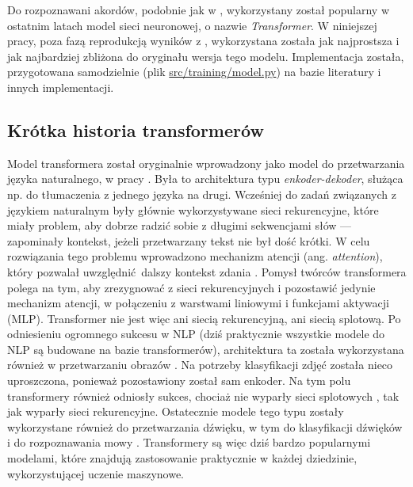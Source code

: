 Do rozpoznawani akordów, podobnie jak w \cite{park_bi-directional_2019}, wykorzystany został
popularny w ostatnim latach model sieci neuronowej, o nazwie \emph{Transformer}. W niniejszej pracy,
poza fazą reprodukcją wyników z \cite{park_bi-directional_2019}, wykorzystana została jak
najprostsza i jak najbardziej zbliżona do oryginału wersja tego modelu. Implementacja została,
przygotowana samodzielnie (plik \url{src/training/model.py}) na bazie literatury i innych
implementacji.


\subsection{Krótka historia transformerów}

Model transformera został oryginalnie wprowadzony jako model do przetwarzania języka naturalnego, w
pracy \cite{vaswani_attention_2017}. Była to architektura typu \emph{enkoder-dekoder}, służąca np.
do tłumaczenia z jednego języka na drugi. Wcześniej do zadań związanych z językiem naturalnym były
głównie wykorzystywane sieci rekurencyjne, które miały problem, aby dobrze radzić sobie z długimi
sekwencjami słów --- zapominały kontekst, jeżeli przetwarzany tekst nie był dość krótki. W celu
rozwiązania tego problemu wprowadzono mechanizm atencji (ang. \emph{attention}), który pozwalał
uwzględnić dalszy kontekst zdania \cite{bahdanau_neural_2016}. Pomysł twórców transformera polega na
tym, aby zrezygnować z sieci rekurencyjnych i pozostawić jedynie mechanizm atencji, w połączeniu z
warstwami liniowymi i funkcjami aktywacji (MLP). Transformer nie jest więc ani siecią rekurencyjną,
ani siecią splotową. Po odniesieniu ogromnego sukcesu w NLP (dziś praktycznie wszystkie modele do
NLP są budowane na bazie transformerów), architektura ta została wykorzystana również w
przetwarzaniu obrazów \cite{dosovitskiy_image_2021}. Na potrzeby klasyfikacji zdjęć została nieco
uproszczona, ponieważ pozostawiony został sam enkoder. Na tym polu transformery również odniosły
sukces, chociaż nie wyparły sieci splotowych \cite{liu_convnet_2022}, tak jak wyparły sieci
rekurencyjne. Ostatecznie modele tego typu zostały wykorzystane również do przetwarzania dźwięku, w
tym do klasyfikacji dźwięków \cite{gong_ast_2021} i do rozpoznawania mowy
\cite{kim_squeezeformer_2022}. Transformery są więc dziś bardzo popularnymi modelami, które znajdują
zastosowanie praktycznie w każdej dziedzinie, wykorzystującej uczenie maszynowe.

